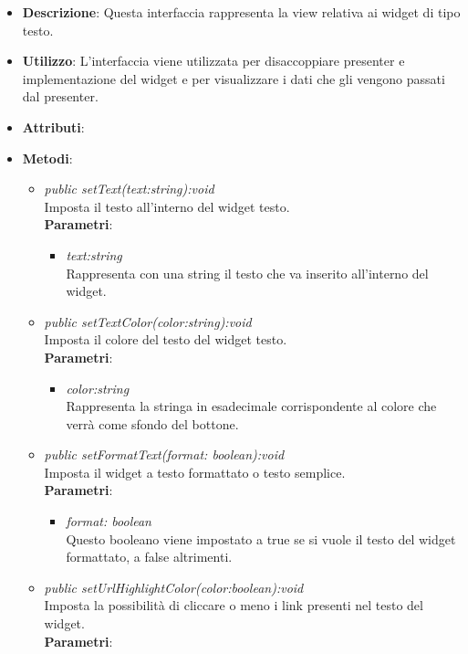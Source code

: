\begin{itemize}
\item \textbf{Descrizione}: Questa interfaccia rappresenta la view relativa ai widget di tipo testo.
\item \textbf{Utilizzo}: L'interfaccia viene utilizzata per disaccoppiare presenter e implementazione del widget e per visualizzare i dati che gli vengono passati dal presenter.
\item \textbf{Attributi}:
\item \textbf{Metodi}:
	\begin{itemize}
	\item \textit{public setText(text:string):void}\\
	Imposta il testo all'interno del widget testo.
		\\ \textbf{Parametri}: \begin{itemize}
		\item \textit{text:string}\\
		Rappresenta con una string il testo che va inserito all'interno del widget.
		\end{itemize}
	\item \textit{public setTextColor(color:string):void}\\
	Imposta il colore del testo del widget testo.
		\\ \textbf{Parametri}: \begin{itemize}
		\item \textit{color:string}\\
		Rappresenta la stringa in esadecimale corrispondente al colore che verrà come sfondo del bottone.
		\end{itemize}
	\item \textit{public setFormatText(format: boolean):void}\\
	Imposta il widget a testo formattato o testo semplice.
		\\ \textbf{Parametri}: \begin{itemize}
		\item \textit{format: boolean}\\
		Questo booleano viene impostato a true se si vuole il testo del widget formattato, a false altrimenti.
		\end{itemize} 
	\item \textit{public setUrlHighlightColor(color:boolean):void}\\
	Imposta la possibilità di cliccare o meno i link presenti nel testo del widget.
		\\ \textbf{Parametri}: \begin{itemize}

\end{itemize}
\end{itemize}
\end{itemize}
